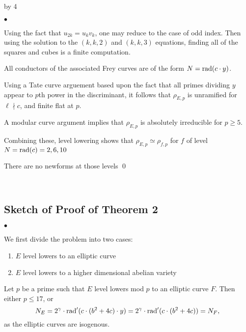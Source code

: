 \documentclass[12pt]{scrartcl}
\newenvironment{citemize}{
\begin{list}{$\bullet$}{\setlength{\itemsep}{0pt} \setlength{\rightmargin}{0pt} \setlength{\leftmargin}{0.5\labelwidth} \setlength{\topsep}{0pt}}
}{\end{list}}
\newcommand{\rad}{{\rm{rad}}}
\newcommand{\notdiv}{\nmid}
\def\anzspalten{4}
\newlength{\kastenwidth}
\newenvironment{kasten}{%
  \begin{lrbox}{\dummybox}%
    \begin{minipage}{0.96\linewidth}}%
    {\end{minipage}%
  \end{lrbox}%
  \raisebox{-\depth}{\psshadowbox[framesep=1em]{\usebox{\dummybox}}}\\[0.5em]}
\newenvironment{spalte}{%
  \setlength\kastenwidth{1.2\textwidth}
  \divide\kastenwidth by \anzspalten
  \begin{minipage}[t]{\kastenwidth}}{\end{minipage}\hfill}
\begin{document}
\begin{lrbox}{\spalten}
{\begin{spalte}
\begin{kasten}
\begin{citemize}

\item Using the fact that $u_{2k} = u_kv_k$, one may reduce to the case of odd index.  Then using the solution to the $(k,k,2)$ and $(k,k, 3)$ equations, finding all of the squares and cubes is a finite computation.

\item All conductors of the associated Frey curves are of the form $N = \rad(c \cdot y)$.

\item Using a Tate curve arguement based upon the fact that all primes dividing $y$ appear to $p$th power in the discriminant, it follows that $\rho_{E,p}$ is unramified for $\ell \notdiv c$, and finite flat at $p$.

\item A modular curve argument implies that $\rho_{E,p}$ is absolutely irreducible for $p \geq 5$.

\item Combining these, level lowering shows that $\rho_{E,p} \simeq \rho_{f,p}$ for $f$ of level $N = \rad(c) = 2,6,10$

\item There are no newforms at those levels \qed

\end{citemize}

\end{kasten}

\begin{kasten}

\subsection*{\color{blue} Sketch of Proof of Theorem 2}

\begin{citemize}

\item We first divide the problem into two cases:
\begin{enumerate}

\item $E$ level lowers to an elliptic curve

\item $E$ level lowers to a higher dimensional abelian variety

\end{enumerate}

\item Let $p$ be a prime such that $E$ level lowers mod $p$ to an elliptic curve $F$.  Then either $p \leq 17$, or
\[ N_E = 2^\gamma \cdot \rad'(c \cdot (b^2+4c)\cdot y) = 2^\gamma \cdot \rad'(c \cdot (b^2+4c)) = N_F, \]
as the elliptic curves are isogenous.


\end{citemize}
\end{kasten}
\end{spalte}}
\end{lrbox}
\end{document}

